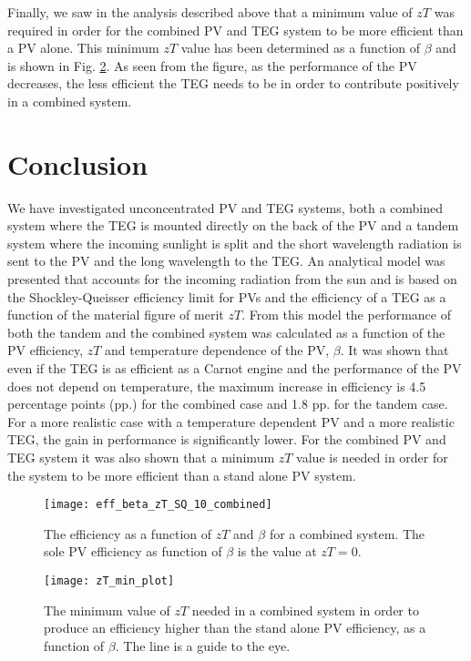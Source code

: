 \documentclass[fleqn,10pt]{SelfArx} %
\begin{document}
Finally, we saw in the analysis described above that a minimum value of $zT$ was required in order for the combined PV and TEG system to be more efficient than a PV alone. This minimum $zT$ value has been determined as a function of $\beta$ and is shown in Fig. \ref{Fig_zT_min_plot}. As seen from the figure, as the performance of the PV decreases, the less efficient the TEG needs to be in order to contribute positively in a combined system.


\section{Conclusion}
We have investigated unconcentrated PV and TEG systems, both a combined system where the TEG is mounted directly on the back of the PV and a tandem system where the incoming sunlight is split and the short wavelength radiation is sent to the PV and the long wavelength to the TEG. An analytical model was presented that accounts for the incoming radiation from the sun and is based on the Shockley-Queisser efficiency limit for PVs and the efficiency of a TEG as a function of the material figure of merit $zT$. From this model the performance of both the tandem and the combined system was calculated as a function of the PV efficiency, $zT$ and temperature dependence of the PV, $\beta$. It was shown that even if the TEG is as efficient as a Carnot engine and the performance of the PV does not depend on temperature, the maximum increase in efficiency is 4.5 percentage points (pp.) for the combined case and 1.8 pp. for the tandem case. For a more realistic case with a temperature dependent PV and a more realistic TEG, the gain in performance is significantly lower. For the combined PV and TEG system it was also shown that a minimum $zT$ value is needed in order for the system to be more efficient than a stand alone PV system.

\begin{figure}
  \centering
  \texttt{[image: eff\_beta\_zT\_SQ\_10\_combined]}
  \caption{The efficiency as a function of $zT$ and $\beta$ for a combined system. The sole PV efficiency as function of $\beta$ is the value at $zT=0$.}
  \label{Fig_eff_beta_zT_SQ}
\end{figure}

\begin{figure}[!t]
  \centering
  \texttt{[image: zT\_min\_plot]}
  \caption{The minimum value of $zT$ needed in a combined system in order to produce an efficiency higher than the stand alone PV efficiency, as a function of $\beta$. The line is a guide to the eye.}
  \label{Fig_zT_min_plot}
\end{figure}
\end{document}
